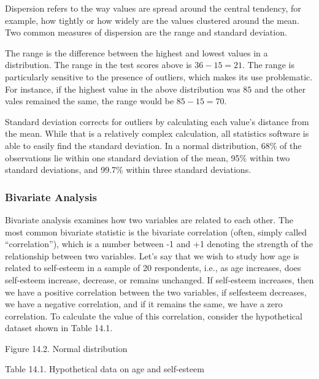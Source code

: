 Dispersion refers to the way values are spread around the central tendency, for example, how tightly or how widely are the values clustered around the mean. Two common measures of dispersion are the range and standard deviation. 

The range is the difference between the highest and lowest values in a distribution. The range in the test scores above is $ 36 - 15 = 21 $. The range is particularly sensitive to the presence of outliers, which makes its use problematic. For instance, if the highest value in the above distribution was $ 85 $ and the other vales remained the same, the range would be $ 85 - 15 = 70 $. 

Standard deviation corrects for outliers by calculating each value's distance from the mean. While that is a relatively complex calculation, all statistics software is able to easily find the standard deviation. In a normal distribution, 68\% of the observations lie within one standard deviation of the mean, 95\% within two standard deviations, and 99.7\% within three standard deviations.

\subsubsection{Bivariate Analysis}

Bivariate analysis examines how two variables are related to each other. The most common bivariate statistic is the bivariate correlation (often, simply called “correlation”), which is a number between -1 and +1 denoting the strength of the relationship between two variables. Let’s say that we wish to study how age is related to self-esteem in a sample of 20 respondents, i.e., as age increases, does self-esteem increase, decrease, or remains unchanged. If self-esteem increases, then we have a positive correlation between the two variables, if selfesteem decreases, we have a negative correlation, and if it remains the same, we have a zero correlation. To calculate the value of this correlation, consider the hypothetical dataset shown in Table 14.1.

Figure 14.2. Normal distribution

Table 14.1. Hypothetical data on age and self-esteem

